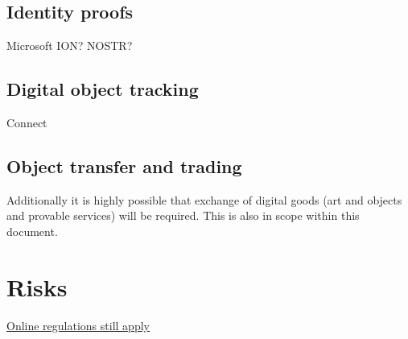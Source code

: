 \subsection{Identity proofs}
Microsoft ION? NOSTR?
\subsection{Digital object tracking}
Connect 
\subsection{Object transfer and trading}
Additionally it is highly possible that exchange of digital goods (art and objects and provable services) will be required. This is also in scope within this document.
\section{Risks}
\href{https://www.carnegieuktrust.org.uk/blog-posts/regulating-the-future-the-online-safety-bill-and-the-metaverse/}{Online regulations still apply}
